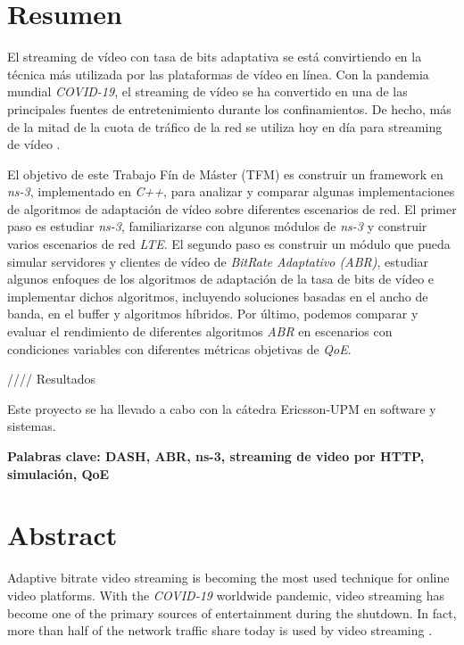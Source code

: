 \cleardoublepage
{}
\chapter*{Resumen}

El streaming de vídeo con tasa de bits adaptativa se está convirtiendo 
en la técnica más utilizada por las plataformas de vídeo en línea. 
Con la pandemia mundial \textit{COVID-19}, el streaming de vídeo se ha convertido 
en una de las principales fuentes de entretenimiento durante los confinamientos. 
De hecho, más de la mitad de la cuota de tráfico de la red se utiliza hoy en 
día para streaming de vídeo \cite{sandvine1}.

El objetivo de este Trabajo Fín de Máster (TFM) es construir un framework en \textit{ns-3},
implementado en \textit{C++}, para analizar y comparar algunas implementaciones de algoritmos de adaptación de vídeo
sobre diferentes escenarios de red. El primer paso 
es estudiar \textit{ns-3}, familiarizarse con algunos módulos de \textit{ns-3} y construir varios 
escenarios de red \textit{LTE}. El segundo paso es construir un módulo que pueda simular 
servidores y clientes de vídeo de \textit{BitRate Adaptativo (ABR)}, estudiar algunos enfoques de los algoritmos
de adaptación de la tasa de bits de vídeo e implementar dichos algoritmos, 
incluyendo soluciones basadas en el ancho de banda, en el buffer y algoritmos 
híbridos. 
Por último, podemos comparar y evaluar el rendimiento de diferentes algoritmos 
\textit{ABR} en escenarios con condiciones variables con diferentes métricas objetivas 
de \textit{QoE}.

//// Resultados

Este proyecto se ha llevado a cabo con la cátedra Ericsson-UPM en software y sistemas.



\vfill
\textbf{Palabras clave: DASH, ABR, ns-3, streaming de video por HTTP, simulación, QoE} 


\cleardoublepage
{}
\chapter*{Abstract}

Adaptive bitrate video streaming is becoming the most used technique for online
video platforms. With the \textit{COVID-19} worldwide pandemic, video streaming has become
one of the primary sources of entertainment during the shutdown. In fact, more
than half of the network traffic share today is used by video streaming \cite{sandvine1}.

